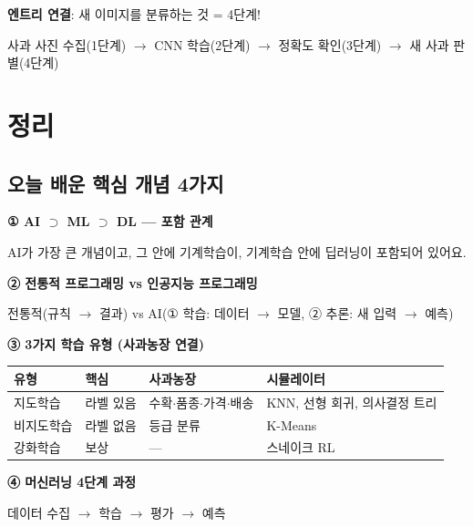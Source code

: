 \documentclass[11pt,a4paper]{article}
\begin{document}
\textbf{엔트리 연결}: 새 이미지를 분류하는 것 = 4단계!

\begin{keybox}
사과 사진 수집(1단계) $\to$ CNN 학습(2단계) $\to$ 정확도 확인(3단계) $\to$ 새 사과 판별(4단계)
\end{keybox}

\newpage

\section{ 정리}

\subsection{오늘 배운 핵심 개념 4가지}

\begin{summarybox}

\textbf{① AI $\supset$ ML $\supset$ DL — 포함 관계}

AI가 가장 큰 개념이고, 그 안에 기계학습이, 기계학습 안에 딥러닝이 포함되어 있어요.

\textbf{② 전통적 프로그래밍 vs 인공지능 프로그래밍}

전통적(규칙 $\to$ 결과) vs AI(① 학습: 데이터 $\to$ 모델, ② 추론: 새 입력 $\to$ 예측)

\textbf{③ 3가지 학습 유형 (사과농장 연결)}

\begin{center}
\begin{tabular}{|l|l|p{3.5cm}|p{4cm}|}
\hline
\rowcolor{tableheader}
\textbf{유형} & \textbf{핵심} & \textbf{사과농장} & \textbf{시뮬레이터} \\
\hline
지도학습 & 라벨 있음 & 수확$\cdot$품종$\cdot$가격$\cdot$배송 & KNN, 선형 회귀, 의사결정 트리 \\
\hline
비지도학습 & 라벨 없음 & 등급 분류 & K-Means \\
\hline
강화학습 & 보상 & — & 스네이크 RL \\
\hline
\end{tabular}
\end{center}

\textbf{④ 머신러닝 4단계 과정}

데이터 수집 $\to$ 학습 $\to$ 평가 $\to$ 예측

\end{summarybox}
\end{document}
